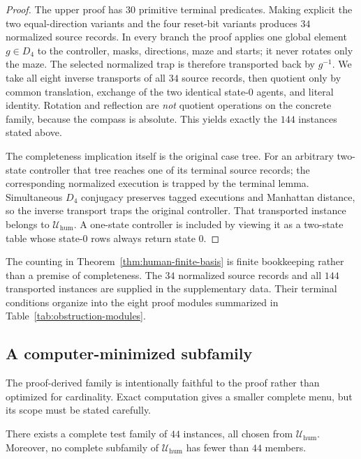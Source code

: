 \begin{proof}
The upper proof has $30$ primitive terminal predicates.  Making explicit the
two equal-direction variants and the four reset-bit variants produces $34$ normalized
source records.  In every branch the proof applies one global element $g\in D_4$ to
the controller, masks, directions, maze and starts; it never rotates only the maze.
The selected normalized trap is therefore transported back by $g^{-1}$.  We take all
eight inverse transports of all $34$ source records, then quotient only by common
translation, exchange of the two identical state-$0$ agents, and literal identity.
Rotation and reflection are \emph{not} quotient operations on the concrete family,
because the compass is absolute.  This yields exactly the $144$ instances stated
above.

The completeness implication itself is the original case tree.  For an
arbitrary two-state controller that tree reaches one of its terminal source records;
the corresponding normalized execution is trapped by the terminal lemma.  Simultaneous
$D_4$ conjugacy preserves tagged executions and Manhattan distance, so the inverse
transport traps the original controller.  That transported instance belongs to
$\mathcal U_{\mathrm{hum}}$.  A one-state controller is included by viewing it as a
two-state table whose state-$0$ rows always return state $0$.
\end{proof}

The counting in Theorem~\ref{thm:human-finite-basis} is finite bookkeeping rather
than a premise of completeness.  The $34$ normalized source records and all $144$
transported instances are supplied in the supplementary data.  Their terminal
conditions organize into the eight proof modules summarized in
Table~\ref{tab:obstruction-modules}.



\subsection{A computer-minimized subfamily}
\label{subsec:44-subfamily}

The proof-derived family is intentionally faithful to the proof rather than optimized for
cardinality.  Exact computation gives a smaller complete menu, but its scope must be
stated carefully.

\begin{proposition}
\label{prop:44-candidate-minimum}
There exists a complete test family of $44$ instances, all chosen from
$\mathcal U_{\mathrm{hum}}$.  Moreover, no complete subfamily of
$\mathcal U_{\mathrm{hum}}$ has fewer than $44$ members.
\end{proposition}

